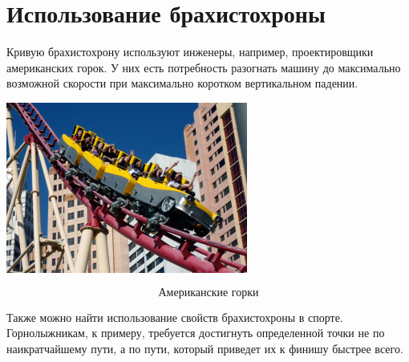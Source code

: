 \documentclass[a4paper, 12pt]{article}
\begin{document}
\part{Использование брахистохроны}
Кривую брахистохрону используют инженеры, например, проектировщики американских горок. У них есть потребность разогнать машину до максимально возможной скорости при максимально коротком вертикальном падении.
\begin{center}
\includegraphics[scale=1]{горки}
\end{center}
\[\textit{Американские горки}\]

Также можно найти использование свойств брахистохроны в спорте. Горнолыжникам, к примеру, требуется достигнуть определенной точки не по наикратчайшему пути, а по пути, который приведет их к финишу быстрее всего.
\end{document}
